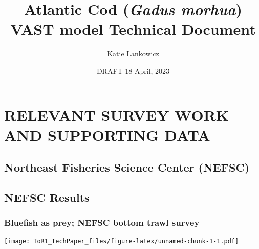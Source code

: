 \documentclass[
]{article}
\title{Atlantic Cod (\emph{Gadus morhua}) VAST model Technical Document}
\author{Katie Lankowicz}
\date{DRAFT 18 April, 2023}
\begin{document}
\maketitle

\hypertarget{relevant-survey-work-and-supporting-data}{%
\section{RELEVANT SURVEY WORK AND SUPPORTING
DATA}\label{relevant-survey-work-and-supporting-data}}

\hypertarget{northeast-fisheries-science-center-nefsc}{%
\subsection{Northeast Fisheries Science Center
(NEFSC)}\label{northeast-fisheries-science-center-nefsc}}

\hypertarget{nefsc-results}{%
\subsection{NEFSC Results}\label{nefsc-results}}

\hypertarget{bluefish-as-prey-nefsc-bottom-trawl-survey}{%
\subsubsection{Bluefish as prey; NEFSC bottom trawl
survey}\label{bluefish-as-prey-nefsc-bottom-trawl-survey}}

\texttt{[image: ToR1\_TechPaper\_files/figure-latex/unnamed-chunk-1-1.pdf]}
\end{document}
